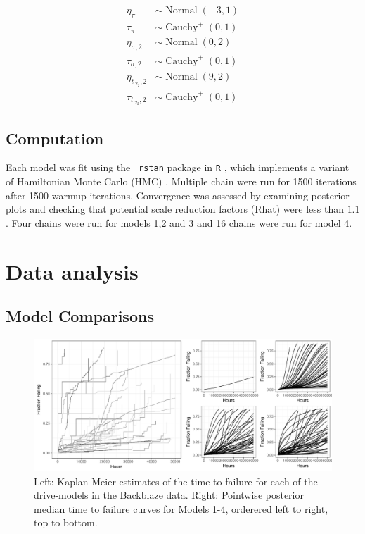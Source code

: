 \documentclass[12pt]{article}
\newcommand{\op}{\operatorname}
\begin{document}
\begin{align*}
  \eta_{\pi} & \sim \op{Normal}(-3, 1)\\
  \tau_{\pi} & \sim \op{Cauchy}^+(0, 1)\\
  \eta_{\sigma ,2} & \sim \op{Normal}(0, 2)\\
  \tau_{\sigma ,2} & \sim \op{Cauchy}^+(0, 1)\\
  \eta_{t_{.2_2},2} & \sim \op{Normal}(9, 2)\\
  \tau_{t_{.2_2},2} & \sim \op{Cauchy}^+(0, 1)
 \end{align*} 

\subsection{Computation}
Each model was fit using the {\tt
  rstan}\cite{rstan} package in {\tt R} \cite{r}, which implements a variant of Hamiltonian Monte Carlo (HMC)
\cite{betancourt}. Multiple chain were run for 1500 iterations after 1500 warmup iterations. Convergence was assessed by examining posterior
plots and checking that potential scale reduction factors (Rhat) \cite{gelman2014bayesian} were less than $1.1$. Four chains were run for models 1,2 and 3 and 16 chains were run for model 4.

\section{Data analysis}


\subsection{Model Comparisons}
\begin{figure}
\includegraphics[width=\textwidth]{fig/heterogeneity_compare_preliminary.pdf}
\caption{Left: Kaplan-Meier estimates of the time to failure for each of the drive-models in the Backblaze data. Right: Pointwise posterior median time to failure curves for Models 1-4, orderered left to right, top to bottom.}
\label{fig2}
\end{figure}
\end{document}

